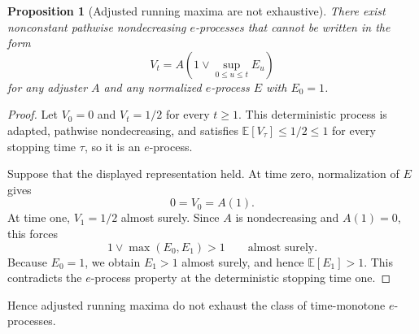 \documentclass[11pt]{article}
\numberwithin{equation}{section}
\theoremstyle{plain}
\newtheorem{proposition}[theorem]{Proposition}
\theoremstyle{definition}
\newcommand{\E}{\mathbb E}
\begin{document}
\begin{proposition}[Adjusted running maxima are not exhaustive]\label{sup:prop:nonadjuster}
There exist nonconstant pathwise nondecreasing $e$-processes that cannot be written in the form
\[
  V_t=A\!\left(1\vee\sup_{0\leq u\leq t}E_u\right)
\]
for any adjuster $A$ and any normalized $e$-process $E$ with $E_0=1$.
\end{proposition}

\begin{proof}
Let $V_0=0$ and $V_t=1/2$ for every $t\geq1$. This deterministic process is adapted, pathwise nondecreasing, and satisfies $\E[V_\tau]\leq1/2\leq1$ for every stopping time $\tau$, so it is an $e$-process.

Suppose that the displayed representation held. At time zero, normalization of $E$ gives
\[
  0=V_0=A(1).
\]
At time one, $V_1=1/2$ almost surely. Since $A$ is nondecreasing and $A(1)=0$, this forces
\[
  1\vee\max(E_0,E_1)>1
  \qquad\text{almost surely}.
\]
Because $E_0=1$, we obtain $E_1>1$ almost surely, and hence $\E[E_1]>1$. This contradicts the $e$-process property at the deterministic stopping time one.
\end{proof}

Hence adjusted running maxima do not exhaust the class of time-monotone $e$-processes.
\end{document}
